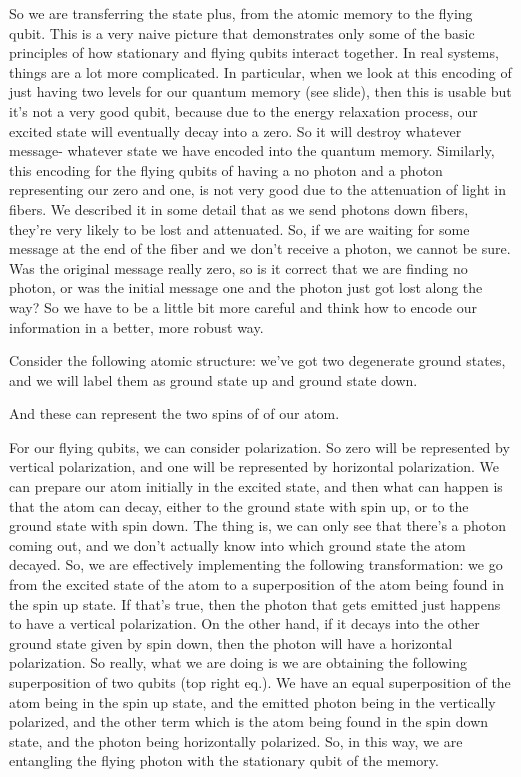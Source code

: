 So we are transferring the state plus, from the atomic memory to the flying qubit. This is a very naive picture that demonstrates only some of the basic principles of how stationary and flying qubits interact together. In real systems, things are a lot more complicated. In particular, when we look at this encoding of just having two levels for our quantum memory (see slide), then this is usable but it's not a very good qubit, because due to the energy relaxation process, our excited state will eventually decay into a zero. So it will destroy whatever message- whatever state we have encoded into the quantum memory. Similarly, this encoding for the flying qubits of having a no photon and a photon representing our zero and one, is not very good due to the attenuation of light in fibers. We described it in some detail that as we send photons down fibers, they're very likely to be lost and attenuated. So, if we are waiting for some message at the end of the fiber and we don't receive a photon, we cannot be sure. Was the original message really zero, so is it correct that we are finding no photon, or was the initial message one and the photon just got lost along the way? So we have to be a little bit more careful and think how to encode our information in a better, more robust way.

Consider the following atomic structure: we've got two degenerate ground states, and we will label them as ground state up and ground state down.

And these can represent the two spins of of our atom.

For our flying qubits, we can consider polarization. So zero will be represented by vertical polarization, and one will be represented by horizontal polarization. We can prepare our atom initially in the excited state, and then what can happen is that the atom can decay, either to the ground state with spin up, or to the ground state with spin down. The thing is, we can only see that there's a photon coming out, and we don't actually know into which ground state the atom decayed. So, we are effectively implementing the following transformation: we go from the excited state of the atom to a superposition of the atom being found in the spin up state. If that's true, then the photon that gets emitted just happens to have a vertical polarization. On the other hand, if it decays into the other ground state given by spin down, then the photon will have a horizontal polarization. So really, what we are doing is we are obtaining the following superposition of two qubits (top right eq.). We have an equal superposition of the atom being in the spin up state, and the emitted photon being in the vertically polarized, and the other term which is the atom being found in the spin down state, and the photon being horizontally polarized. So, in this way, we are entangling the flying photon with the stationary qubit of the memory.

